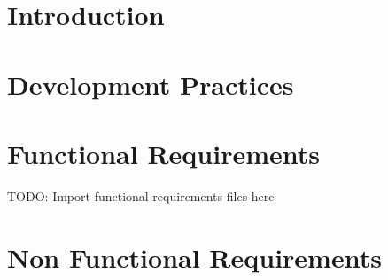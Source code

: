 



\chapter{Introduction}








\chapter{Development Practices}







\chapter{Functional Requirements}


TODO: Import functional requirements files here







\newpage



\chapter{Non Functional Requirements}




